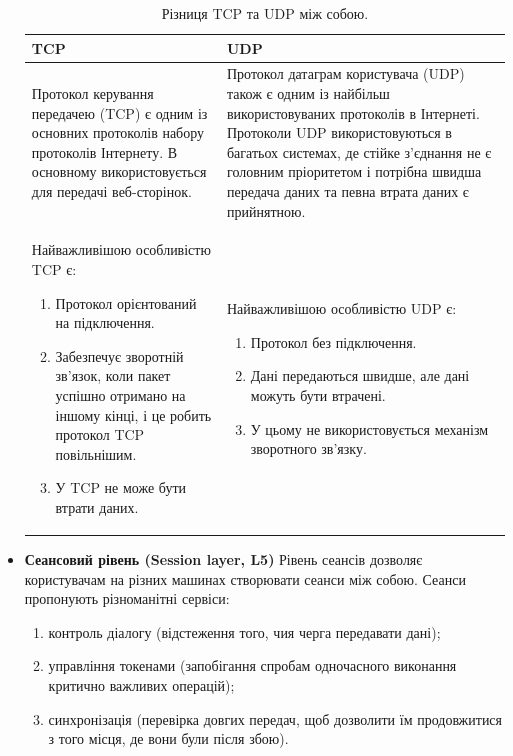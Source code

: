 \begin{itemize}
    \begin{table}[ht]
    \label{tab:tcp_diff_udp}
    \begin{tabularx}{\textwidth}{X|X} 
	      \textbf{TCP} & \textbf{UDP} \\
        \hline
        Протокол керування передачею (TCP) є одним із основних протоколів набору протоколів Інтернету. В основному використовується для передачі веб-сторінок. & Протокол датаграм користувача (UDP) також є одним із найбільш використовуваних протоколів в Інтернеті. Протоколи UDP використовуються в багатьох системах, де стійке з’єднання не є головним пріоритетом і потрібна швидша передача даних та певна втрата даних є прийнятною. \\
        \hline
        Найважливішою особливістю TCP є:
            \begin{enumerate}
                \item Протокол орієнтований на підключення.
                \item Забезпечує зворотній зв’язок, коли пакет успішно отримано на іншому кінці, і це робить протокол TCP повільнішим.
                \item У TCP не може бути втрати даних.
            \end{enumerate}
             & Найважливішою особливістю UDP є:
            \begin{enumerate}
                \item Протокол без підключення.
                \item Дані передаються швидше, але дані можуть бути втрачені.
                \item У цьому не використовується механізм зворотного зв'язку.
            \end{enumerate} \\
    \end{tabularx}
        \caption{Різниця TCP та UDP між собою.}
    \end{table}

    \item \textbf{Сеансовий рівень (Session layer, L5)}
    Рівень сеансів дозволяє користувачам на різних машинах створювати сеанси між собою. Сеанси пропонують різноманітні сервіси:
    \begin{enumerate}
        \item контроль діалогу (відстеження того, чия черга передавати дані);
        \item управління токенами (запобігання спробам одночасного виконання критично важливих операцій);
        \item синхронізація (перевірка довгих передач, щоб дозволити їм продовжитися з того місця, де вони були після збою).
    \end{enumerate}


\end{itemize}
